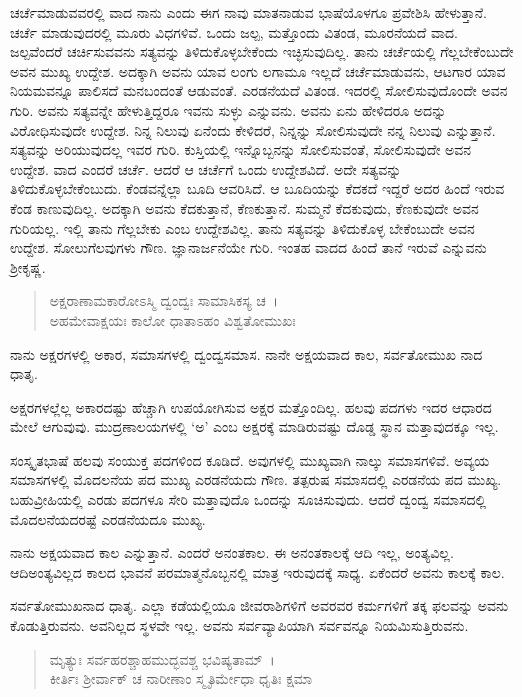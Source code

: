 ಚರ್ಚೆಮಾಡುವವರಲ್ಲಿ ವಾದ ನಾನು ಎಂದು ಈಗ ನಾವು ಮಾತನಾಡುವ ಭಾಷೆಯೊಳಗೂ ಪ್ರವೇಶಿಸಿ ಹೇಳುತ್ತಾನೆ. ಚರ್ಚೆ ಮಾಡುವುದರಲ್ಲಿ ಮೂರು ವಿಧಗಳಿವೆ. ಒಂದು ಜಲ್ಪ, ಮತ್ತೊಂದು ವಿತಂಡ, ಮೂರನೆಯದೆ ವಾದ. ಜಲ್ಪವೆಂದರೆ ಚರ್ಚಿಸುವವನು ಸತ್ಯವನ್ನು ತಿಳಿದುಕೊಳ್ಳಬೇಕೆಂದು ಇಚ್ಛಿಸುವುದಿಲ್ಲ. ತಾನು ಚರ್ಚೆಯಲ್ಲಿ ಗೆಲ್ಲಬೇಕೆಂಬುದೇ ಅವನ ಮುಖ್ಯ ಉದ್ದೇಶ. ಅದಕ್ಕಾಗಿ ಅವನು ಯಾವ ಲಂಗು ಲಗಾಮೂ ಇಲ್ಲದೆ ಚರ್ಚೆಮಾಡುವನು, ಆಟಗಾರ ಯಾವ ನಿಯಮವನ್ನೂ ಪಾಲಿಸದೆ ಮನಬಂದಂತೆ ಆಡುವಂತೆ. ಎರಡನೆಯದೆ ವಿತಂಡ. ಇದರಲ್ಲಿ ಸೋಲಿಸುವುದೊಂದೇ ಅವನ ಗುರಿ. ಅವನು ಸತ್ಯವನ್ನೇ ಹೇಳುತ್ತಿದ್ದರೂ ಇವನು ಸುಳ್ಳು ಎನ್ನುವನು. ಅವನು ಏನು ಹೇಳಿದರೂ ಅದನ್ನು ವಿರೋಧಿಸುವುದೇ ಉದ್ದೇಶ. ನಿನ್ನ ನಿಲುವು ಏನೆಂದು ಕೇಳಿದರೆ, ನಿನ್ನನ್ನು ಸೋಲಿಸುವುದೇ ನನ್ನ ನಿಲುವು ಎನ್ನುತ್ತಾನೆ. ಸತ್ಯವನ್ನು ಅರಿಯುವುದಲ್ಲ ಇವರ ಗುರಿ. ಕುಸ್ತಿಯಲ್ಲಿ ಇನ್ನೊಬ್ಬನನ್ನು ಸೋಲಿಸುವಂತೆ, ಸೋಲಿಸುವುದೇ ಅವನ ಉದ್ದೇಶ. ವಾದ ಎಂದರೆ ಚರ್ಚೆ. ಆದರೆ ಆ ಚರ್ಚೆಗೆ ಒಂದು ಉದ್ದೇಶವಿದೆ. ಅದೇ ಸತ್ಯವನ್ನು ತಿಳಿದುಕೊಳ್ಳಬೇಕೆಂಬುದು. ಕೆಂಡವನ್ನೆಲ್ಲಾ ಬೂದಿ ಆವರಿಸಿದೆ. ಆ ಬೂದಿಯನ್ನು ಕೆದಕದೆ ಇದ್ದರೆ ಅದರ ಹಿಂದೆ ಇರುವ ಕೆಂಡ ಕಾಣುವುದಿಲ್ಲ. ಅದಕ್ಕಾಗಿ ಅವನು ಕೆದಕುತ್ತಾನೆ, ಕೆಣಕುತ್ತಾನೆ. ಸುಮ್ಮನೆ ಕೆದಕುವುದು, ಕೆಣಕುವುದೇ ಅವನ ಗುರಿಯಲ್ಲ. ಇಲ್ಲಿ ತಾನು ಗೆಲ್ಲಬೇಕು ಎಂಬ ಉದ್ದೇಶವಿಲ್ಲ. ತಾನು ಸತ್ಯವನ್ನು ತಿಳಿದುಕೊಳ್ಳ ಬೇಕೆಂಬುದೇ ಅವನ ಉದ್ದೇಶ. ಸೋಲುಗೆಲವುಗಳು ಗೌಣ. ಜ್ಞಾನಾರ್ಜನೆಯೇ ಗುರಿ. ಇಂತಹ ವಾದದ ಹಿಂದೆ ತಾನೆ ಇರುವೆ ಎನ್ನುವನು ಶ‍್ರೀಕೃಷ್ಣ.

\begin{verse}
ಅಕ್ಷರಾಣಾಮಕಾರೋಽಸ್ಮಿ ದ್ವಂದ್ವಃ ಸಾಮಾಸಿಕಸ್ಯ ಚ~।\\ಅಹಮೇವಾಕ್ಷಯಃ ಕಾಲೋ ಧಾತಾಽಹಂ ವಿಶ್ವತೋಮುಖಃ 
\end{verse}

{\small ನಾನು ಅಕ್ಷರಗಳಲ್ಲಿ ಅಕಾರ, ಸಮಾಸಗಳಲ್ಲಿ ದ್ವಂದ್ವಸಮಾಸ. ನಾನೇ ಅಕ್ಷಯವಾದ ಕಾಲ, ಸರ್ವತೋಮುಖ ನಾದ ಧಾತೃ.}

ಅಕ್ಷರಗಳಲ್ಲೆಲ್ಲ ಅಕಾರದಷ್ಟು ಹೆಚ್ಚಾಗಿ ಉಪಯೋಗಿಸುವ ಅಕ್ಷರ ಮತ್ತೊಂದಿಲ್ಲ. ಹಲವು ಪದಗಳು ಇದರ ಆಧಾರದ ಮೇಲೆ ಆಗುವುವು. ಮುದ್ರಣಾಲಯಗಳಲ್ಲಿ ‘ಅ’ ಎಂಬ ಅಕ್ಷರಕ್ಕೆ ಮಾಡಿರುವಷ್ಟು ದೊಡ್ಡ ಸ್ಥಾನ ಮತ್ತಾವುದಕ್ಕೂ ಇಲ್ಲ.

ಸಂಸ್ಕೃತಭಾಷೆ ಹಲವು ಸಂಯುಕ್ತ ಪದಗಳಿಂದ ಕೂಡಿದೆ. ಅವುಗಳಲ್ಲಿ ಮುಖ್ಯವಾಗಿ ನಾಲ್ಕು ಸಮಾಸಗಳಿವೆ. ಅವ್ಯಯ ಸಮಾಸಗಳಲ್ಲಿ ಮೊದಲನೆಯ ಪದ ಮುಖ್ಯ ಎರಡನೆಯದು ಗೌಣ. ತತ್ಪರುಷ ಸಮಾಸದಲ್ಲಿ ಎರಡನೆಯ ಪದ ಮುಖ್ಯ. ಬಹುವ್ರೀಹಿಯಲ್ಲಿ ಎರಡು ಪದಗಳೂ ಸೇರಿ ಮತ್ತಾವುದೊ ಒಂದನ್ನು ಸೂಚಿಸುವುದು. ಆದರೆ ದ್ವಂದ್ವ ಸಮಾಸದಲ್ಲಿ ಮೊದಲನೆಯದರಷ್ಟೆ ಎರಡನೆಯದೂ ಮುಖ್ಯ.

ನಾನು ಅಕ್ಷಯವಾದ ಕಾಲ ಎನ್ನುತ್ತಾನೆ. ಎಂದರೆ ಅನಂತಕಾಲ. ಈ ಅನಂತಕಾಲಕ್ಕೆ ಆದಿ ಇಲ್ಲ, ಅಂತ್ಯವಿಲ್ಲ. ಆದಿಅಂತ್ಯವಿಲ್ಲದ ಕಾಲದ ಭಾವನೆ ಪರಮಾತ್ಮನೊಬ್ಬನಲ್ಲಿ ಮಾತ್ರ ಇರುವುದಕ್ಕೆ ಸಾಧ್ಯ. ಏಕೆಂದರೆ ಅವನು ಕಾಲಕ್ಕೆ ಕಾಲ.

ಸರ್ವತೋಮುಖನಾದ ಧಾತೃ. ಎಲ್ಲಾ ಕಡೆಯಲ್ಲಿಯೂ ಜೀವರಾಶಿಗಳಿಗೆ ಅವರವರ ಕರ್ಮಗಳಿಗೆ ತಕ್ಕ ಫಲವನ್ನು ಅವನು ಕೊಡುತ್ತಿರುವನು. ಅವನಿಲ್ಲದ ಸ್ಥಳವೇ ಇಲ್ಲ. ಅವನು ಸರ್ವವ್ಯಾಪಿಯಾಗಿ ಸರ್ವವನ್ನೂ ನಿಯಮಿಸುತ್ತಿರುವನು.

\begin{verse}
ಮೃತ್ಯುಃ ಸರ್ವಹರಶ್ಚಾಹಮುದ್ಭವಶ್ಚ ಭವಿಷ್ಯತಾಮ್~।\\ಕೀರ್ತಿಃ ಶ‍್ರೀರ್ವಾಕ್ ಚ ನಾರೀಣಾಂ ಸ್ಮೃತಿರ್ಮೇಧಾ ಧೃತಿಃ ಕ್ಷಮಾ 
\end{verse}

